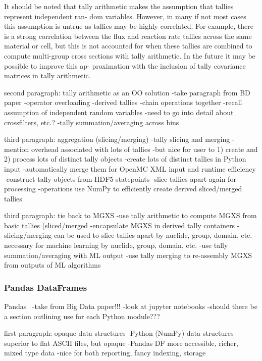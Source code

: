 It should be noted that tally arithmetic makes the assumption that tallies represent independent ran-
dom variables. However, in many if not most cases this assumption is untrue as tallies may be highly
correlated. For example, there is a strong correlation between the flux and reaction rate tallies across
the same material or cell, but this is not accounted for when these tallies are combined to compute
multi-group cross sections with tally arithmetic. In the future it may be possible to improve this ap-
proximation with the inclusion of tally covariance matrices in tally arithmetic.

second paragraph: tally arithmetic as an OO solution
-take paragraph from BD paper
-operator overloading
-derived tallies
-chain operations together
-recall assumption of independent random variables
-need to go into detail about crossfilters, etc.?
-tally summation/averaging across bins

third paragraph: aggregation (slicing/merging)
-tally slicing and merging
-mention overhead associated with lots of tallies
-but nice for user to 1) create and 2) process lots of distinct tally objects
  -create lots of distinct tallies in Python input
  -automatically merge them for OpenMC \ac{XML} input and runtime efficiency
  -construct tally objects from HDF5 statepoints
  -slice tallies apart again for processing
-operations use NumPy to efficiently create derived sliced/merged tallies

third paragraph: tie back to MGXS
-use tally arithmetic to compute MGXS from basic tallies (sliced/merged
-encapsulate MGXS in derived tally containers
-slicing/merging can be used to slice tallies apart by nuclide, group, domain, etc.
  -necessary for machine learning by nuclide, group, domain, etc.
  -use tally summation/averaging with ML output
  -use tally merging to re-assembly MGXS from outputs of ML algorithms

\subsubsection{Pandas DataFrames}
\label{sec:chap3-pandas-df}

Pandas~\cite{mckinney2010pandas}
-take from Big Data paper!!!
-look at jupyter notebooks
-should there be a section outlining use for each Python module???

first paragraph: opaque data structures
-Python (NumPy) data structures superior to flat \ac{ASCII} files, but opaque
-Pandas DF more accessible, richer, mixed type data
-nice for both reporting, fancy indexing, storage

